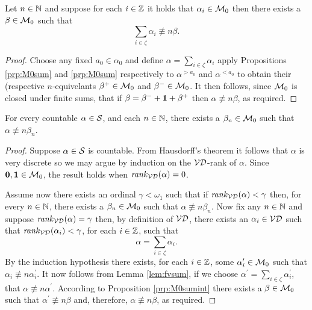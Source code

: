 \begin{prp}\label{prp:M0sumint}
	Let $n\in\mathbb{N}$ and suppose for each $i\in\mathbb{Z}$ it holds that $\alpha_i\in\mathcal{M}_0$ then there exists a $\beta\in\mathcal{M}_0$ such that
	\begin{equation}
		\sum_{i\in\zeta}\alpha_i\nequiv{n}\beta.
	\end{equation}
\end{prp}
\begin{proof}
	Choose any fixed $a_0\in\alpha_0$ and define $\alpha=\sum_{i\in\zeta}\alpha_i$ apply Propositions \ref{prp:M0sum} and \ref{prp:M0sum} respectively to $\alpha^{>a_0}$ and $\alpha^{<a_0}$ to obtain their (respective $n$-equivelants $\beta^+\in\mathcal{M}_0$ and $\beta^-\in\mathcal{M}_0$.  It then follows, since $\mathcal{M}_0$ is closed under finite sums, that if $\beta=\beta^-+\mathbf{1}+\beta^+$ then $\alpha\nequiv{n}\beta$, as required.
\end{proof}

\begin{thm}
	For every countable $\alpha\in\mathcal{S}$, and each $n\in\mathbb{N}$, there exists a $\beta_n\in\mathcal{M}_0$ such that $\alpha\nequiv{n}\beta_n$.
\end{thm}
\begin{proof}
	Suppose $\alpha\in\mathcal{S}$ is countable.  From Hausdorff's theorem it follows that $\alpha$ is very discrete so we may argue by induction on the $\mathcal{VD}$-rank of $\alpha$. Since $\mathbf{0},\mathbf{1}\in\mathcal{M}_0$, the result holds when $\mathit{rank}_\mathcal{VD}(\alpha)=0$.

	Assume now there exists an ordinal $\gamma<\omega_1$ such that if $\mathit{rank}_\mathcal{VD}(\alpha)<\gamma$ then, for every $n\in\mathbb{N}$, there exists a $\beta_n\in\mathcal{M}_0$ such that $\alpha\nequiv{n}\beta_n$.  Now fix any $n\in\mathbb{N}$ and  suppose $\mathit{rank}_\mathcal{VD}(\alpha)=\gamma$ then, by definition of $\mathcal{VD}$, there exists an $\alpha_i\in\mathcal{VD}$ such that $\mathit{rank}_\mathcal{VD}(\alpha_i)<\gamma$, for each $i\in\mathbb{Z}$, such that
	\begin{equation}
		\alpha=\sum_{i\in\zeta}\alpha_i.
	\end{equation}
	By the induction hypothesis there exists, for each $i\in\mathbb{Z}$, some $\alpha^\prime_i\in\mathcal{M}_0$ such that $\alpha_i\nequiv{n}\alpha_i^\prime$.  It now follows from Lemma \ref{lem:fvsum}, if we choose $\alpha^\prime=\sum_{i\in\zeta}\alpha_i^\prime$, that $\alpha\nequiv{n}\alpha^\prime$.  According to Proposition \ref{prp:M0sumint} there exists a $\beta\in\mathcal{M}_0$ such that $\alpha^\prime\nequiv{n}\beta$ and, therefore, $\alpha\nequiv{n}\beta$, as required.
\end{proof}

